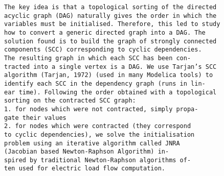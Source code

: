 {\scriptsize
\begin{verbatim}
The key idea is that a topological sorting of the directed
acyclic graph (DAG) naturally gives the order in which the
variables must be initialised. Therefore, this led to study
how to convert a generic directed graph into a DAG. The
solution found is to build the graph of strongly connected
components (SCC) corresponding to cyclic dependencies.
The resulting graph in which each SCC has been con-
tracted into a single vertex is a DAG. We use Tarjan’s SCC
algorithm (Tarjan, 1972) (used in many Modelica tools) to
identify each SCC in the dependency graph (runs in lin-
ear time). Following the order obtained with a topological
sorting on the contracted SCC graph:
1. for nodes which were not contracted, simply propa-
gate their values
2. for nodes which were contracted (they correspond
to cyclic dependencies), we solve the initialisation
problem using an iterative algorithm called JNRA
(Jacobian based Newton-Raphson Algorithm) in-
spired by traditional Newton-Raphson algorithms of-
ten used for electric load flow computation.
\end{verbatim}
}